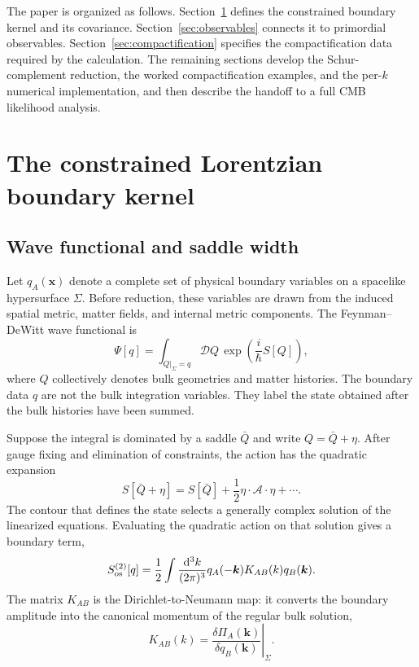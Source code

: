 \documentclass[11pt,a4paper]{article}
\newcommand{\dd}{\mathrm d}
\begin{document}
The paper is organized as follows.  Section~\ref{sec:kernel} defines the constrained boundary kernel and its covariance.  Section~\ref{sec:observables} connects it to primordial observables.  Section~\ref{sec:compactification} specifies the compactification data required by the calculation.  The remaining sections develop the Schur-complement reduction, the worked compactification examples, and the per-$k$ numerical implementation, and then describe the handoff to a full CMB likelihood analysis.

\section{The constrained Lorentzian boundary kernel}
\label{sec:kernel}

\subsection{Wave functional and saddle width}
Let $q_A(\bm x)$ denote a complete set of physical boundary variables on a spacelike hypersurface $\Sigma$. Before reduction, these variables are drawn from the induced spatial metric, matter fields, and internal metric components. The Feynman--DeWitt wave functional is
\begin{equation}
\Psi[q]=\int_{Q|_\Sigma=q}\mathcal DQ\,
\exp\left(\frac{i}{\hbar}S[Q]\right),
\end{equation}
where $Q$ collectively denotes bulk geometries and matter histories. The boundary data $q$ are not the bulk integration variables. They label the state obtained after the bulk histories have been summed.

Suppose the integral is dominated by a saddle $\bar Q$ and write $Q=\bar Q+\eta$. After gauge fixing and elimination of constraints, the action has the quadratic expansion
\begin{equation}
S[\bar Q+\eta]=S[\bar Q]+\frac12\eta\cdot\mathcal A\cdot\eta+\cdots .
\end{equation}
The contour that defines the state selects a generally complex solution of the linearized equations. Evaluating the quadratic action on that solution gives a boundary term,
\begin{equation}
S_{\rm os}^{(2)}[q]=\frac12\int\frac{\dd^3k}{(2\pi)^3}
q_A(-\bm k)K_{AB}(k)q_B(\bm k).
\label{eq:onshell}
\end{equation}
The matrix $K_{AB}$ is the Dirichlet-to-Neumann map: it converts the boundary amplitude into the canonical momentum of the regular bulk solution,
\begin{equation}
K_{AB}(k)=\left.\frac{\delta\Pi_A(\bm k)}{\delta q_B(\bm k)}\right|_\Sigma.
\end{equation}
\end{document}
